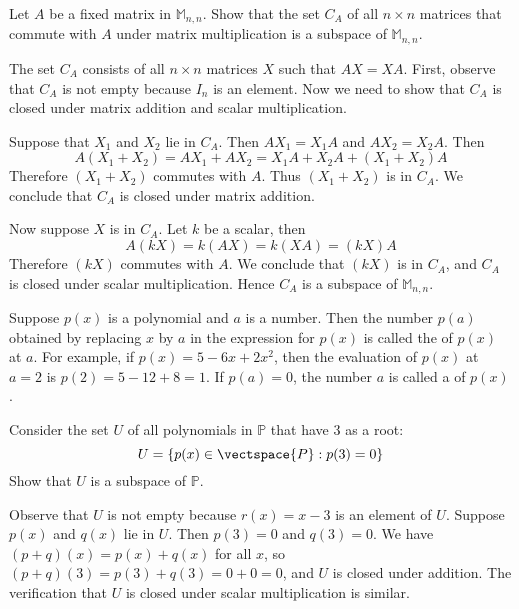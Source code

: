 \documentclass{ximera}
\begin{document}
\begin{example}\label{ex:centralizerofA}
Let $A$ be a fixed matrix in $\mathbb{M}_{n,n}$. Show that the set $C_A$ of all $n\times n$ matrices that commute with $A$ under matrix multiplication  is a subspace of $\mathbb{M}_{n,n}$.  

\begin{explanation}
The set $C_A$ consists of all $n\times n$ matrices $X$ such that $AX=XA$.  First, observe that $C_A$ is not empty because $I_n$ is an element.  Now we need to show that $C_A$ is closed under matrix addition and scalar multiplication.

Suppose that $X_1$ and $X_{2}$ lie in $C_A$.  Then $AX_1 = X_1A$ and $AX_{2} = X_{2}A$. Then
$$
A(X_1 + X_2) 	= AX_1 + AX_2 = X_1A + X_2A + (X_1 + X_2)A $$
Therefore $(X_1+X_2)$ commutes with $A$.  Thus $(X_1+X_2)$ is in $C_A$.  We conclude that $C_A$ is closed under matrix addition.

Now suppose $X$ is in $C_A$.  Let $k$ be a scalar, then
$$
A(kX)= k(AX) = k(XA) = (kX)A
$$
Therefore $(kX)$ commutes with $A$.  We conclude that $(kX)$ is in $C_A$, and $C_A$ is closed under scalar multiplication.
 Hence $C_A$ is a subspace of $\mathbb{M}_{n,n}$.
\end{explanation}
\end{example}

Suppose $p(x)$ is a polynomial and $a$ is a number. Then the number $p(a)$ obtained by replacing $x$ by $a$ in the expression for $p(x)$ is called the  of $p(x)$ at $a$. For example, if $p(x) = 5 - 6x + 2x^{2}$, then the evaluation of $p(x)$ at $a = 2$ is $p(2) = 5 - 12 + 8 = 1$. If $p(a) = 0$, the number $a$ is called a  of $p(x)$.

\begin{example}\label{ex:root3}
Consider the set $U$ of all polynomials in $\mathbb{P}$ that have $3$ as a root:
\begin{equation*}
U = \{p(x) \in \vectspace{P} : p(3) = 0 \}
\end{equation*}
Show that $U$ is a subspace of $\mathbb{P}$.

\begin{explanation}
  Observe that $U$ is not empty because $r(x)=x-3$ is an element of $U$.  Suppose $p(x)$ and $q(x)$ lie in $U$.  Then $p(3) = 0$ and $q(3) = 0$. We have $(p + q)(x) = p(x) + q(x)$ for all $x$, so $(p + q)(3) = p(3) + q(3) = 0 + 0 = 0$, and $U$ is closed under addition. The verification that $U$ is closed under scalar multiplication is similar.
\end{explanation}
\end{example}
\end{document}
